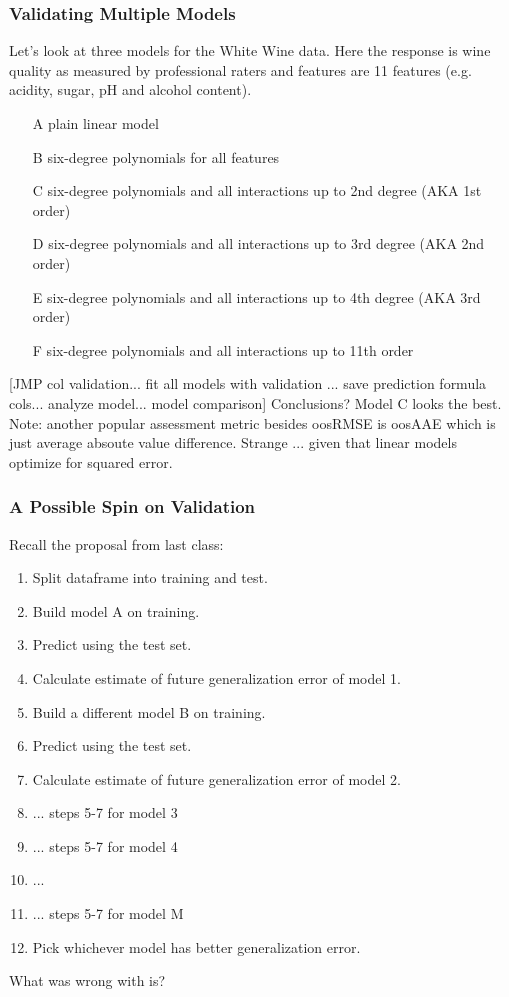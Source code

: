 \documentclass[handout]{beamer}
\begin{document}
\begin{frame}\frametitle{Validating Multiple Models}
\footnotesize
Let's look at three models for the White Wine data. Here the response is wine quality as measured by professional raters and features are 11 features (e.g. acidity, sugar, pH and alcohol content).

\vspace{-0.1cm}
\begin{enumerate}\footnotesize
\item[A] plain linear model \pause
\item[B] six-degree polynomials for all features \pause
\item[C] six-degree polynomials and all interactions up to 2nd degree (AKA 1st order) \pause
\item[D] six-degree polynomials and all interactions up to 3rd degree (AKA 2nd order) \pause
\item[E] six-degree polynomials and all interactions up to 4th degree (AKA 3rd order) \pause
\item[F] six-degree polynomials and all interactions up to 11th order \pause
\end{enumerate}
\footnotesize
\vspace{-0.1cm}
[JMP col validation... fit all models with validation ... save prediction formula cols... analyze model... model comparison] \pause Conclusions? \pause Model C looks the best. \pause Note: another popular assessment metric besides oosRMSE is oosAAE which is just average absoute value difference. Strange ... given that linear models optimize for squared error. \pause {} 
	
\end{frame}

\begin{frame}\frametitle{A Possible Spin on Validation}
\small

Recall the proposal from last class:
	
\begin{enumerate}\footnotesize
\item Split dataframe into training and test.
\item Build model A on training.
\item Predict using the test set. 
\item Calculate estimate of future generalization error of model 1.
\item Build a different model B on training.
\item Predict using the test set. 
\item Calculate estimate of future generalization error of model 2.
\item ... steps 5-7 for model 3
\item ... steps 5-7 for model 4
\item ...
\item ... steps 5-7 for model M
\item Pick whichever model has better generalization error.
\end{enumerate}

What was wrong with is?

\end{frame}
\end{document}
